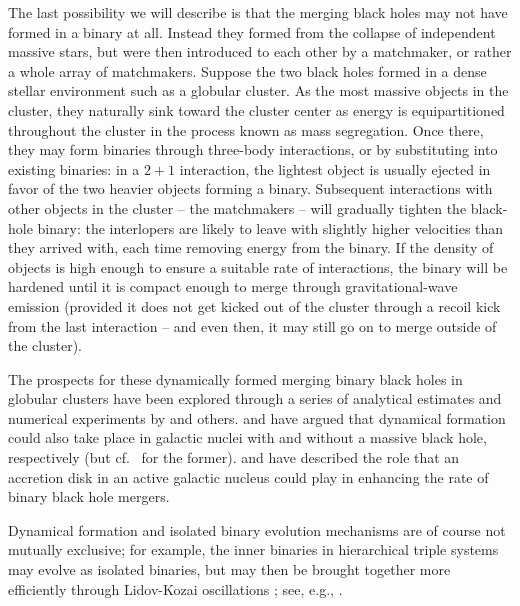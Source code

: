 \documentclass[iop,onecolumn]{revtex4}
\begin{document}
The last possibility we will describe is that the merging black holes may not have formed in a binary at all.  Instead they formed from the collapse of independent massive stars, but were then introduced to each other by a matchmaker, or rather a whole array of matchmakers.  Suppose the two black holes formed in a dense stellar environment such as a globular cluster.  As the most massive objects in the cluster, they naturally sink toward the cluster center as energy is equipartitioned throughout the cluster in the process known as mass segregation.  Once there, they may form binaries through three-body interactions, or by substituting into existing binaries: in a $2+1$ interaction, the lightest object is usually ejected in favor of the two heavier objects forming a binary.  Subsequent interactions with other objects in the cluster -- the matchmakers -- will gradually tighten the black-hole binary: the interlopers are likely to leave with  slightly higher velocities than they arrived with, each time removing energy from the binary.   If the density of objects is high enough to ensure a suitable rate of interactions, the binary will be hardened until it is compact enough to merge through gravitational-wave emission (provided it does not get kicked out of the cluster through a recoil kick from the last interaction -- and even then, it may still go on to merge outside of the cluster).  

The prospects for these dynamically formed merging binary black holes in globular clusters have been explored through a series of analytical estimates and numerical experiments by \citet{Sigurdsson:1993,Kulkarni:1993,PZwart:2000,OLeary:2006,Banerjee:2010,Downing:2011,Morscher:2015,Mapelli:2016,Rodriguez:2016} and others.  \citet{OLeary:2008} and \citet{MillerLauburg:2008} have argued that dynamical formation could also take place in galactic nuclei with and without a massive black hole, respectively (but cf.~\citet{Tsang:2013} for the former).  \citet{Bartos:2016} and \citet{Stone:2016} have described the role that an accretion disk in an active galactic nucleus could play in enhancing the rate of binary black hole mergers.

Dynamical formation and isolated binary evolution mechanisms are of course not mutually exclusive; for example, the inner binaries in hierarchical triple systems may evolve as isolated binaries, but may then be brought together more efficiently through Lidov-Kozai oscillations \citep{Lidov:1962,Kozai:1962}; see, e.g., \citet{PeretsKratter:2012,Belczynski:2014VMS}.
\end{document}
